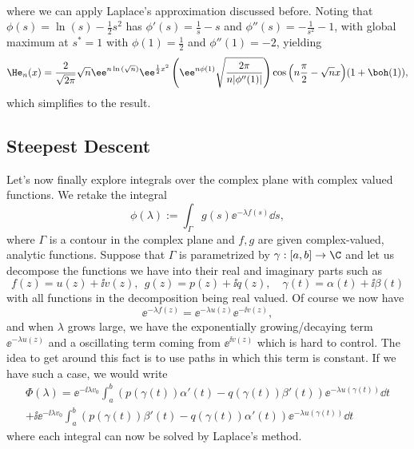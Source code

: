\begin{exemplo}
\begin{align}
	\end{align}
	where we can apply Laplace's approximation discussed before. Noting that $\phi(s) = \ln{(s)} - \frac{1}{2}s^2$ has $\phi'(s) = \frac{1}{s} - s$ and $\phi''(s) = -\frac{1}{s^2} - 1$, with global maximum at $s^* = 1$ with $\phi(1) = \frac{1}{2}$ and $\phi''(1) = -2$, yielding
	\begin{align}
		\He_n(x) = \frac{2}{\sqrt{2\pi}} \sqrt{n} \ee^{n\ln{(\sqrt{n})}} \ee^{\frac{1}{2}x^2}  \left( \ee^{n\phi(1)} \sqrt{\frac{2\pi}{n|\phi''(1)|}} \right) \cos{\left(n\frac{\pi}{2} - \sqrt{n}x\right)} (1+\boh(1)),
	\end{align}
	which simplifies to the result.
	\label{Example: Hermite o(1)}
\end{exemplo}

\subsection{Steepest Descent}

Let's now finally explore integrals over the complex plane with complex valued functions. We retake the integral 
\begin{equation}
	\phi(\lambda) := \int_{\Gamma} g(s) \ee^{-\lambda f(s)} \dd s,
	\label{eq: general int}
\end{equation}
where $\Gamma$ is a contour in the complex plane and $f, g$ are given complex-valued, analytic functions. Suppose that $\Gamma$ is parametrized by $\gamma : [a,b] \rightarrow \C$ and let us decompose the functions we have into their real and imaginary parts such as
\begin{equation}
	f(z) = u(z) + \ii v(z), \ \ g(z) = p(z) + \ii q(z), \quad \gamma(t) = \alpha(t) + \ii \beta(t)
\end{equation}
with all functions in the decomposition being real valued. Of course we now have 
\begin{equation}
	\ee^{-\lambda f(z)} = \ee^{-\lambda u(z)} \ee^{-\ii v(z)},
\end{equation}
and when $\lambda$ grows large, we have the exponentially growing/decaying term $\ee^{-\lambda u(z)}$ and a oscillating term coming from $\ee^{\ii v(z)}$ which is hard to control. The idea to get around this fact is to use paths in which this term is constant. If we have such a case, we would write
\begin{multline}
	\Phi(\lambda) = \ee^{-\ii \lambda v_0} \int_{a}^{b} (p(\gamma(t))\alpha'(t)-q(\gamma(t))\beta'(t)) \ee^{-\lambda u(\gamma(t))} \dd t \\
	+ \ii \ee^{-\ii \lambda v_0} \int_{a}^{b} (p(\gamma(t))\beta'(t)-q(\gamma(t))\alpha'(t)) \ee^{-\lambda u(\gamma(t))} \dd t
	\label{eq: decomposition}
\end{multline}
where each integral can now be solved by Laplace's method.

